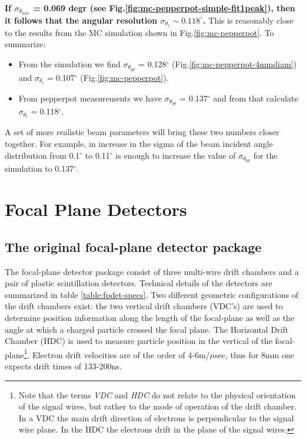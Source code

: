\documentclass[11pt]{report}
\begin{document}
{\bf If $\sigma_{\theta_{hole}}$  = 0.069 degr (see Fig.\ref{fig:mc-pepperpot-simple-fit1peak}), then it follows that the angular resolution
$\sigma_{\theta_{r}} \sim 0.118^{\circ}$.
}
This is reasonably close to the results from the MC simulation shown in Fig.\ref{fig:mc-pepperpot}.
%
To summarize: 
\begin{itemize}
\item From the simulation we find $\sigma_{\theta_{pp}}$ = 0.128$^{\circ}$ 
(Fig.\ref{fig:mc-pepperpot-4mmdiam})
and  $\sigma_{\theta_{r}} = $0.107$^{\circ}$
(Fig.\ref{fig:mc-pepperpot}).
\item From pepperpot measurements we have $\sigma_{\theta_{pp}}$ = 0.137$^{\circ}$ and  from that calculate $\sigma_{\theta_{r}} = $0.118$^{\circ}$.
\end{itemize}
\noindent A set of more realistic beam parameters will bring these two numbers closer together. For example, in increase in the sigma of the beam incident angle distribution from 0.1$^{\circ}$ to 
0.11$^{\circ}$ is enough to increase the value of $\sigma_{\theta_{pp}}$ for the simulation to 
0.137$^{\circ}$.


\newpage

\chapter{Focal Plane Detectors}


\section{The original focal-plane detector package}


The focal-plane detector package consist of three 
multi-wire drift chambers and a pair of plastic scintillation detectors.
Technical details of the detectors are summarized in table \ref{table:fpdet-specs}.
Two different geometric configurations of the drift chambers exist:
the two vertical drift chambers (VDC's) are used to determine position
information along the length of the focal-plane as well as the angle at
which a charged particle crossed the focal plane. The  
Horizontal Drift Chamber (HDC) is used to measure particle position in 
the vertical of the focal-plane\footnote{Note that the terms {\it VDC} and {\it HDC} 
do not relate to the physical orientation of the signal wires, but rather to the
mode of operation of the drift chamber. In a VDC the main drift direction of 
electrons is perpendicular to the signal wire plane. In the HDC the electrons
drift in the plane of the signal wires.}.
Electron drift velocities are of the order of 4-6m/$\mu$sec, thus for 8mm one expects
drift times of 133-200ns.
\end{document}
